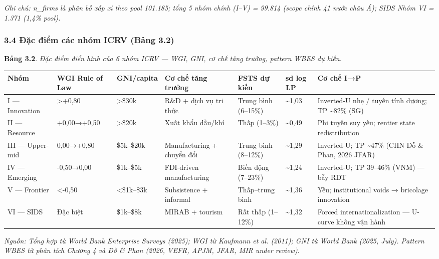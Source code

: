 \documentclass[12pt,a4paper]{article}
\begin{document}
\emph{Ghi chú: n\_firms là phân bố xấp xỉ theo pool 101.185; tổng 5 nhóm
chính (I--V) = 99.814 (scope chính 41 nước châu Á); SIDS Nhóm VI = 1.371
(1,4\% pool).}

\hypertarget{34-ux111ux1eb7c-ux111iux1ec3m-cuxe1c-nhuxf3m-icrv-bux1ea3ng-32}{%
\subsubsection{3.4 Đặc điểm các nhóm ICRV (Bảng
3.2)}\label{34-ux111ux1eb7c-ux111iux1ec3m-cuxe1c-nhuxf3m-icrv-bux1ea3ng-32}}

\textbf{Bảng 3.2}. \emph{Đặc điểm điển hình của 6 nhóm ICRV --- WGI,
GNI, cơ chế tăng trưởng, pattern WBES dự kiến.}

\begin{longtable}[]{@{}lllllll@{}}
\toprule\noalign{}
Nhóm & WGI Rule of Law & GNI/capita & Cơ chế tăng trưởng & FSTS dự kiến
& sd log LP & Cơ chế I→P \\
\midrule\noalign{}
\endhead
\bottomrule\noalign{}
\endlastfoot
I --- Innovation & \textgreater+0,80 & \textgreater\$30k & R\&D + dịch
vụ tri thức & Trung bình (6--15\%) & \textasciitilde1,03 & Inverted-U
nhẹ / tuyến tính dương; TP \textasciitilde82\% (SG) \\
II --- Resource & +0,00→+0,50 & \textgreater\$20k & Xuất khẩu dầu/khí &
Thấp (1--3\%) & \textasciitilde0,49 & Phi tuyến suy yếu; rentier state
redistribution \\
III --- Upper-mid & 0,00→+0,80 & \$5k--\$20k & Manufacturing + chuyển
đổi & Trung bình (8--12\%) & \textasciitilde1,29 & Inverted-U; TP
\textasciitilde47\% (CHN Đỗ \& Phan, 2026 JFAR) \\
IV --- Emerging & -0,50→0,00 & \$1k--\$5k & FDI-driven manufacturing &
Biến động (7--23\%) & \textasciitilde1,24 & Inverted-U; TP 39--46\%
(VNM) --- bẫy RDT \\
V --- Frontier & \textless-0,50 & \textless\$1k--\$3k & Subsistence +
informal & Thấp--trung bình & \textasciitilde1,36 & Yếu; institutional
voids → bricolage innovation \\
VI --- SIDS & Đặc biệt & \$1k--\$8k & MIRAB + tourism & Rất thấp
(1--12\%) & \textasciitilde1,32 & Forced internationalization ---
U-curve không vận hành \\
\end{longtable}

\emph{Nguồn: Tổng hợp từ World Bank Enterprise Surveys (2025); WGI từ
Kaufmann et al. (2011); GNI từ World Bank (2025, July). Pattern WBES từ
phân tích Chương 4 và Đỗ \& Phan (2026, VEFR, APJM, JFAR, MIR under
review).}
\end{document}
